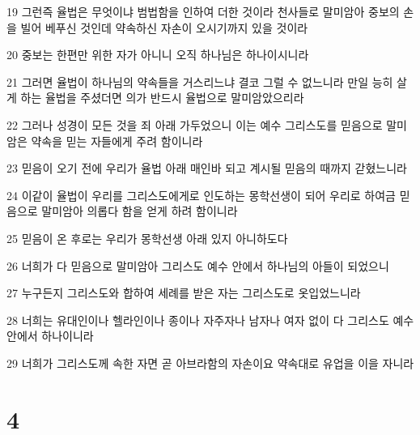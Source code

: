\par 19 그런즉 율법은 무엇이냐 범법함을 인하여 더한 것이라 천사들로 말미암아 중보의 손을 빌어 베푸신 것인데 약속하신 자손이 오시기까지 있을 것이라
\par 20 중보는 한편만 위한 자가 아니니 오직 하나님은 하나이시니라
\par 21 그러면 율법이 하나님의 약속들을 거스리느냐 결코 그럴 수 없느니라 만일 능히 살게 하는 율법을 주셨더면 의가 반드시 율법으로 말미암았으리라
\par 22 그러나 성경이 모든 것을 죄 아래 가두었으니 이는 예수 그리스도를 믿음으로 말미암은 약속을 믿는 자들에게 주려 함이니라
\par 23 믿음이 오기 전에 우리가 율법 아래 매인바 되고 계시될 믿음의 때까지 갇혔느니라
\par 24 이같이 율법이 우리를 그리스도에게로 인도하는 몽학선생이 되어 우리로 하여금 믿음으로 말미암아 의롭다 함을 얻게 하려 함이니라
\par 25 믿음이 온 후로는 우리가 몽학선생 아래 있지 아니하도다
\par 26 너희가 다 믿음으로 말미암아 그리스도 예수 안에서 하나님의 아들이 되었으니
\par 27 누구든지 그리스도와 합하여 세례를 받은 자는 그리스도로 옷입었느니라
\par 28 너희는 유대인이나 헬라인이나 종이나 자주자나 남자나 여자 없이 다 그리스도 예수 안에서 하나이니라
\par 29 너희가 그리스도께 속한 자면 곧 아브라함의 자손이요 약속대로 유업을 이을 자니라

\chapter{4}

